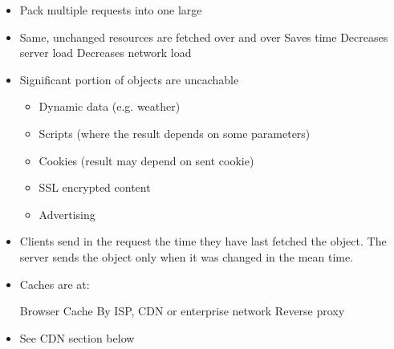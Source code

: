 \begin{itemize}
\begin{itemize}
\begin{itemize}
\begin{itemize}
                            \item Pack multiple requests into one large
                        \end{itemize}
                \end{itemize}
                \begin{itemize}
                    \item Same, unchanged resources are fetched over and over
                    \ipro Saves time
                    \ipro Decreases server load
                    \ipro Decreases network load
                    \item Significant portion of objects are uncachable
                        \begin{itemize}
                            \item Dynamic data (e.g. weather)
                            \item Scripts (where the result depends on some parameters)
                            \item Cookies (result may depend on sent cookie)
                            \item SSL encrypted content
                            \item Advertising
                        \end{itemize}
                    \item Clients send in the request the time they have last fetched the object. The server sends the object only when it was changed in the mean time.
                    \item Caches are at:
                        \begin{itemize}
                             Browser Cache
                             By ISP, CDN or enterprise network
                             Reverse proxy
                        \end{itemize}
                \end{itemize}
                \begin{itemize}
                    \item See CDN section below
                \end{itemize}
        \end{itemize}
\end{itemize}

